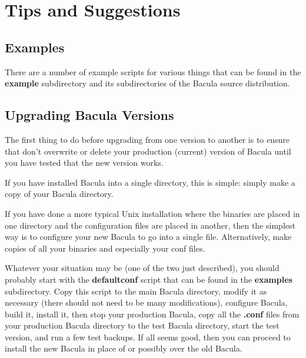 
\section*{Tips and Suggestions}
\label{_ChapterStart8}

\subsection*{Examples}
\label{examples}

There are a number of example scripts for various things that can be found in
the {\bf example} subdirectory and its subdirectories of the Bacula source
distribution. 

\subsection*{Upgrading Bacula Versions}
\label{upgrading}

The first thing to do before upgrading from one version to another is to
ensure that don't overwrite or delete your production (current) version of Bacula until
you have tested that the new version works. 

If you have installed Bacula into a single directory, this is simple: simply
make a copy of your Bacula directory. 

If you have done a more typical Unix installation where the binaries are
placed in one directory and the configuration files are placed in another,
then the simplest way is to configure your new Bacula to go into a single
file. Alternatively, make copies of all your binaries and especially your 
conf files.

Whatever your situation may be (one of the two just described), you should
probably start with the {\bf defaultconf} script that can be found in the {\bf
examples} subdirectory. Copy this script to the main Bacula directory, modify
it as necessary (there should not need to be many modifications), configure
Bacula, build it, install it, then stop your production Bacula, copy all the
{\bf *.conf} files from your production Bacula directory to the test Bacula
directory, start the test version, and run a few test backups. If all seems
good, then you can proceed to install the new Bacula in place of or possibly
over the old Bacula. 

